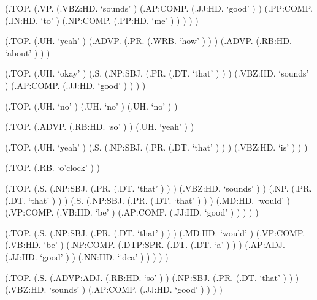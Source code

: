 \documentclass[10pt]{article}
\begin{document}
\begin{parsetree}  (.TOP. (.VP. (.VBZ:HD. `sounds' ) (.AP:COMP. (.JJ:HD. `good' ) ) (.PP:COMP. (.IN:HD. `to' ) (.NP:COMP. (.PP:HD. `me' ) ) ) ) ) \end{parsetree}

\begin{parsetree}  (.TOP. (.UH. `yeah' ) (.ADVP. (.PR. (.WRB. `how' ) ) ) (.ADVP. (.RB:HD. `about' ) ) ) \end{parsetree}

\begin{parsetree}  (.TOP. (.UH. `okay' ) (.S. (.NP:SBJ. (.PR. (.DT. `that' ) ) ) (.VBZ:HD. `sounds' ) (.AP:COMP. (.JJ:HD. `good' ) ) ) ) \end{parsetree}

\begin{parsetree}  (.TOP. (.UH. `no' ) (.UH. `no' ) (.UH. `no' ) ) \end{parsetree}

\begin{parsetree}  (.TOP. (.ADVP. (.RB:HD. `so' ) ) (.UH. `yeah' ) ) \end{parsetree}

\begin{parsetree}  (.TOP. (.UH. `yeah' ) (.S. (.NP:SBJ. (.PR. (.DT. `that' ) ) ) (.VBZ:HD. `is' ) ) ) \end{parsetree}

\begin{parsetree}  (.TOP. (.RB. `o'clock' ) ) \end{parsetree}

\begin{parsetree}  (.TOP. (.S. (.NP:SBJ. (.PR. (.DT. `that' ) ) ) (.VBZ:HD. `sounds' ) ) (.NP. (.PR. (.DT. `that' ) ) ) (.S. (.NP:SBJ. (.PR. (.DT. `that' ) ) ) (.MD:HD. `would' ) (.VP:COMP. (.VB:HD. `be' ) (.AP:COMP. (.JJ:HD. `good' ) ) ) ) ) \end{parsetree}

\begin{parsetree}  (.TOP. (.S. (.NP:SBJ. (.PR. (.DT. `that' ) ) ) (.MD:HD. `would' ) (.VP:COMP. (.VB:HD. `be' ) (.NP:COMP. (.DTP:SPR. (.DT. (.DT. `a' ) ) ) (.AP:ADJ. (.JJ:HD. `good' ) ) (.NN:HD. `idea' ) ) ) ) ) \end{parsetree}

\begin{parsetree}  (.TOP. (.S. (.ADVP:ADJ. (.RB:HD. `so' ) ) (.NP:SBJ. (.PR. (.DT. `that' ) ) ) (.VBZ:HD. `sounds' ) (.AP:COMP. (.JJ:HD. `good' ) ) ) ) \end{parsetree}
\end{document}
